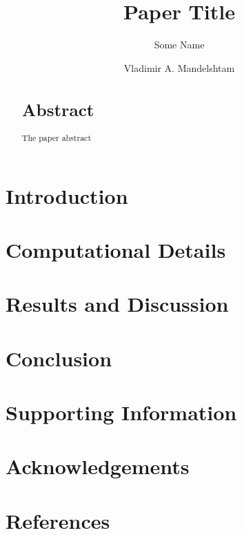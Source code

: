 \documentclass[aps,prd,twocolumn,longbibliography]{revtex4-1}
\begin{document}
\npthousandsep{}

\title{Paper Title}

\author{Some Name}
\author{Vladimir A. Mandelshtam}

\begin{abstract}
\section*{Abstract}
The paper abstract
	\lipsum[1-2]
\end{abstract}

\maketitle

\section*{Introduction}
\label{sec:introduction}
\lipsum[5-10]

\section*{Computational Details}
\label{sec:comp_details}

\lipsum[10-15]

\section*{Results and Discussion}
\label{sec:results}

\lipsum[5-20]

\section*{Conclusion}
\label{sec:conclusion}

\lipsum[3-5]

\section*{Supporting Information}
\lipsum[3-5]

\section*{Acknowledgements}
\lipsum[1-2]

\section*{References}
%
%
\end{document}
